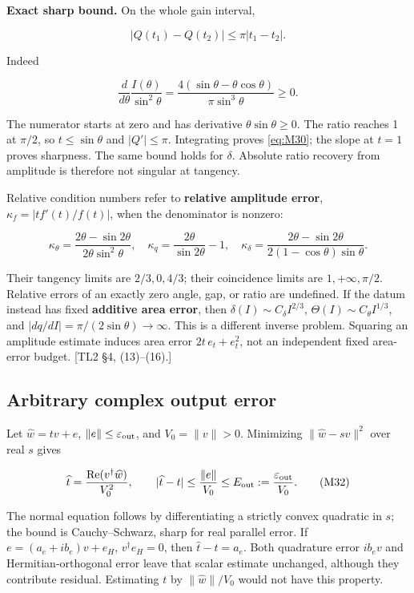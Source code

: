 \documentclass[11pt,a4paper]{article}
\begin{document}
\textbf{Exact sharp bound.} On the whole gain interval,

\[
\boxed{|Q(t_1)-Q(t_2)|\le\pi|t_1-t_2|.}
\tag{M30}\label{eq:M30}
\]

Indeed

\[
\frac d{d\theta}\frac{I(\theta)}{\sin^2\theta}
=\frac{4(\sin\theta-\theta\cos\theta)}{\pi\sin^3\theta}\ge0.
\]

The numerator starts at zero and has derivative \(\theta\sin\theta\ge0\). The ratio reaches 1 at \(\pi/2\), so \(t\le\sin\theta\) and \(|Q'|\le\pi\). Integrating proves \eqref{eq:M30}; the slope at \(t=1\) proves sharpness. The same bound holds for \(\delta\). Absolute ratio recovery from amplitude is therefore not singular at tangency.

Relative condition numbers refer to \textbf{relative amplitude error}, \(\kappa_f=|t f'(t)/f(t)|\), when the denominator is nonzero:

\[
\kappa_\theta=\frac{2\theta-\sin2\theta}{2\theta\sin^2\theta},\quad
\kappa_q=\frac{2\theta}{\sin2\theta}-1,\quad
\kappa_\delta=\frac{2\theta-\sin2\theta}{2(1-\cos\theta)\sin\theta}.
\tag{M31}\label{eq:M31}
\]

Their tangency limits are \(2/3,0,4/3\); their coincidence limits are \(1,+\infty,\pi/2\). Relative errors of an exactly zero angle, gap, or ratio are undefined. If the datum instead has fixed \textbf{additive area error}, then \(\delta(I)\sim C_\delta I^{2/3}\), \(\Theta(I)\sim C_\theta I^{1/3}\), and \(|dq/dI|=\pi/(2\sin\theta)\to\infty\). This is a different inverse problem. Squaring an amplitude estimate induces area error \(2t\,e_t+e_t^2\), not an independent fixed area-error budget. [TL2 \S{}4, (13)--(16).]

\subsection{Arbitrary complex output error}

Let \(\widehat w=tv+e\), \(\|e\|\le\varepsilon_{\rm out}\), and \(V_0=\|v\|>0\). Minimizing \(\|\widehat w-sv\|^2\) over real \(s\) gives

\[
\widehat t=\frac{\operatorname{Re}(v^\dagger\widehat w)}{V_0^2},
\qquad |\widehat t-t|\le\frac{\|e\|}{V_0}
\le E_{\rm out}:=\frac{\varepsilon_{\rm out}}{V_0}.
\tag{M32}\label{eq:M32}
\]

The normal equation follows by differentiating a strictly convex quadratic in \(s\); the bound is Cauchy--Schwarz, sharp for real parallel error. If \(e=(a_e+ib_e)v+e_H\), \(v^\dagger e_H=0\), then \(\widehat t-t=a_e\). Both quadrature error \(ib_ev\) and Hermitian-orthogonal error leave that scalar estimate unchanged, although they contribute residual. Estimating \(t\) by \(\|\widehat w\|/V_0\) would not have this property.
\end{document}
